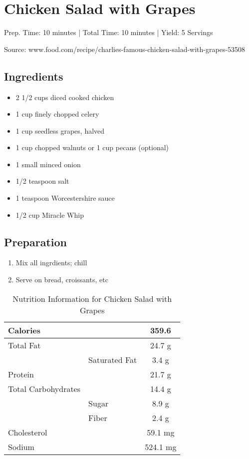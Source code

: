 \section{Chicken Salad with Grapes}

\begin{center}
\noindent Prep. Time: 10 minutes |
Total Time: 10 minutes | 
Yield: 5 Servings

Source: www.food.com/recipe/charlies-famous-chicken-salad-with-grapes-53508
\end{center}

\subsection{Ingredients}
\begin{itemize}
    \item 2 1/2 cups diced cooked chicken
    \item 1 cup finely chopped celery
    \item 1 cup seedless grapes, halved
    \item 1 cup chopped walnuts or 1 cup pecans (optional)
    \item 1 small minced onion
    \item 1/2 teaspoon salt
    \item 1 teaspoon Worcestershire sauce
    \item 1/2 cup Miracle Whip
\end{itemize}

\subsection{Preparation}
\begin{enumerate}
    \item Mix all ingrdients; chill
    \item Serve on bread, croissants, etc
\end{enumerate}

\begin{table}%
    \centering
    \begin{tabular}{|ll|c|}
        \hline
        Calories & & 359.6\\
        \hline
        Total Fat & & 24.7 g \\
        & Saturated Fat & 3.4 g\\
        \hline
        Protein & & 21.7 g\\
        \hline
        Total Carbohydrates & & 14.4 g\\
        & Sugar & 8.9 g\\
        & Fiber & 2.4 g\\
        \hline
        Cholesterol & & 59.1 mg\\
        \hline
        Sodium & & 524.1 mg\\
        \hline
    \end{tabular}
    \caption{Nutrition Information for Chicken Salad with Grapes}
\end{table}

